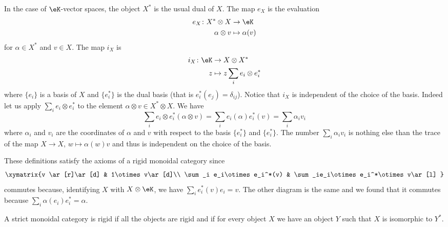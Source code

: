 \begin{example}
    In the case of \( \eK\)-vector spaces, the object \( X^*\) is the usual dual of \( X\). The map \( e_X\) is the evaluation
    \begin{equation}
        \begin{aligned}
            e_X\colon X^*\otimes X&\to \eK \\
            \alpha\otimes v&\mapsto \alpha(v) 
        \end{aligned}
    \end{equation}
    for \( \alpha\in X^*\) and \( v\in X\). The map \( i_X\) is
    \begin{equation}
        \begin{aligned}
            i_X\colon \eK&\to X\otimes X^* \\
            z&\mapsto z\sum_i e_i\otimes e^*_i 
        \end{aligned}
    \end{equation}
    where \( \{ e_i \}\) is a basis of \( X\) and \( \{ e_i^* \} \) is the dual basis (that is \( e_i^*(e_j)=\delta_{ij}\)). Notice that \( i_X\) is independent of the choice of the basis. Indeed let us apply \( \sum_ie_i\otimes e_i^*\) to the element \( \alpha\otimes v\in X^*\otimes X\). We have
    \begin{equation}
        \sum_ie_i\otimes e_i^*(\alpha\otimes v)=\sum_ie_i(\alpha)e_i^*(v)=\sum_i\alpha_i v_i
    \end{equation}
    where \( \alpha_i\) and \( v_i\) are the coordinates of \( \alpha\) and \( v\) with respect to the basis \( \{ e_i^* \}\) and \( \{ e_i^* \}\). The number \( \sum_i\alpha_iv_i\) is nothing else than the trace of the map \( X\to X\), \( w\mapsto\alpha(w)v\) and thus is independent on the choice of the basis. 

    These definitions satisfy the axioms of a rigid monoidal category since
    \begin{equation}
        \xymatrix{%
        v \ar[r]\ar[d]        &   1\otimes v\ar[d]\\
           \sum_i e_i\otimes e_i^*(v)   &   \sum_ie_i\otimes e_i^*\otimes v\ar[l]
           }
    \end{equation}
    commutes because, identifying \( X\) with \( X\otimes\eK\), we have \( \sum_ie_i^*(v)e_i=v\). The other diagram is the same and we found that it commutes because \( \sum_i\alpha(e_i)e_i^*=\alpha\).
\end{example}

A strict monoidal category is rigid if all the objects are rigid and if for every object \( X\) we have an object \( Y\) such that \( X\) is isomorphic to \( Y^*\).

